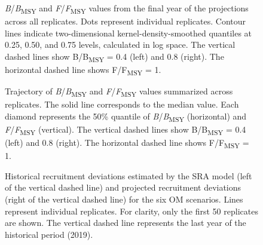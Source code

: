 \documentclass[11pt]{book}
\begin{document}
\begin{figure}[htb]

{\centering {} 

}

\caption{\emph{B}/\emph{B}\textsubscript{MSY} and \emph{F}/\emph{F}\textsubscript{MSY} values from the final year of the projections across all replicates. Dots represent individual replicates. Contour lines indicate two-dimensional kernel-density-smoothed quantiles at 0.25, 0.50, and 0.75 levels, calculated in log space. The vertical dashed lines show B/B\textsubscript{MSY} = 0.4 (left) and 0.8 (right). The horizontal dashed line shows F/F\textsubscript{MSY} = 1.}\label{fig:kobe}
\end{figure}
\clearpage


\begin{figure}[htb]

{\centering {} 

}

\caption{Trajectory of \emph{B}/\emph{B}\textsubscript{MSY} and \emph{F}/\emph{F}\textsubscript{MSY} values summarized across replicates. The solid line corresponds to the median value. Each diamond represents the 50\% quantile of \emph{B}/\emph{B}\textsubscript{MSY} (horizontal) and \emph{F}/\emph{F}\textsubscript{MSY} (vertical). The vertical dashed lines show B/B\textsubscript{MSY} = 0.4 (left) and 0.8 (right). The horizontal dashed line shows F/F\textsubscript{MSY} = 1.}\label{fig:worm}
\end{figure}
\clearpage


\begin{figure}[htb]

{\centering {} 

}

\caption{Historical recruitment deviations estimated by the SRA model (left of the vertical dashed line) and projected recruitment deviations (right of the vertical dashed line) for the six OM scenarios. Lines represent individual replicates. For clarity, only the first 50 replicates are shown. The vertical dashed line represents the last year of the historical period (2019).}\label{fig:recdev-om-proj}
\end{figure}
\clearpage
\end{document}
